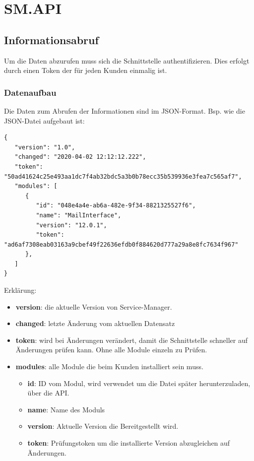 \documentclass{article}
\begin{document}
\section{SM.API}

\subsection{Informationsabruf}

Um die Daten abzurufen muss sich die Schnittstelle authentifizieren. Dies erfolgt durch einen Token der für jeden Kunden einmalig ist.

\subsubsection{Datenaufbau}

Die Daten zum Abrufen der Informationen sind im JSON-Format. 
Bsp. wie die JSON-Datei aufgebaut ist:
\begin{verbatim}
{
   "version": "1.0",
   "changed": "2020-04-02 12:12:12.222",
   "token": "50ad41624c25e493aa1dc7f4ab32bdc5a3b0b78ecc35b539936e3fea7c565af7",
   "modules": [
      {
         "id": "048e4a4e-ab6a-482e-9f34-8821325527f6",
         "name": "MailInterface",
         "version": "12.0.1",
         "token": "ad6af7308eab03163a9cbef49f22636efdb0f884620d777a29a8e8fc7634f967"
      },
   ]
}
\end{verbatim}

Erklärung: 
\begin{itemize}
  \item \textbf{version}: die aktuelle Version von Service-Manager.
  \item \textbf{changed}: letzte Änderung vom aktuellen Datensatz
  \item \textbf{token}: wird bei Änderungen verändert, damit die Schnittstelle schneller auf Änderungen prüfen kann. Ohne alle Module einzeln zu Prüfen.
  \item \textbf{modules}: alle Module die beim Kunden installiert sein muss.
  \begin{itemize}
  	\item \textbf{id}: ID vom Modul, wird verwendet um die Datei später herunterzuladen, über die API.
  	\item \textbf{name}: Name des Moduls
  	\item \textbf{version}: Aktuelle Version die Bereitgestellt wird.
  	\item \textbf{token}: Prüfungstoken um die installierte Version abzugleichen auf Änderungen.
  \end{itemize}
\end{itemize}
\end{document}
